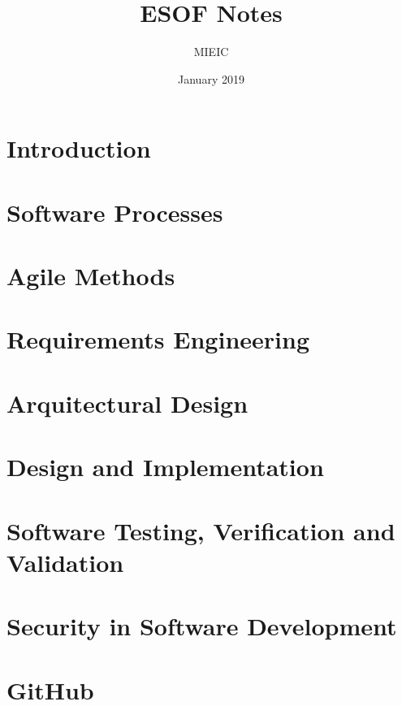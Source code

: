 \documentclass{article}
\title{ESOF Notes}
\author{MIEIC}
\date{January 2019}
\begin{document}
\maketitle

\tableofcontents

\section{Introduction}



\section{Software Processes}



\section{Agile Methods}



\section{Requirements Engineering}



\section{Arquitectural Design}



\section{Design and Implementation}



\section{Software Testing, Verification and Validation}



\section{Security in Software Development}



\section{GitHub}


\end{document}
